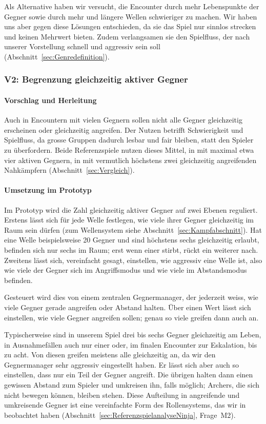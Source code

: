 \documentclass[../Main.tex]{subfiles}
\begin{document}
Als Alternative haben wir versucht, die Encounter durch mehr Lebenspunkte der Gegner sowie durch mehr und längere Wellen schwieriger zu machen. Wir haben uns aber gegen diese Lösungen entschieden, da sie das Spiel nur sinnlos strecken und keinen Mehrwert bieten. Zudem verlangsamen sie den Spielfluss, der nach unserer Vorstellung schnell und aggressiv sein soll (Abschnitt~\ref{sec:Genredefinition}).

\subsubsection{V2: Begrenzung gleichzeitig aktiver Gegner} \label{sec:V2}

\paragraph{Vorschlag und Herleitung}
Auch in Encountern mit vielen Gegnern sollen nicht alle Gegner gleichzeitig erscheinen oder gleichzeitig angreifen. Der Nutzen betrifft Schwierigkeit und Spielfluss, da grosse Gruppen dadurch lesbar und fair bleiben, statt den Spieler zu überfordern. Beide Referenzspiele nutzen dieses Mittel, in  mit maximal etwa vier aktiven Gegnern, in  mit vermutlich höchstens zwei gleichzeitig angreifenden Nahkämpfern (Abschnitt~\ref{sec:Vergleich}).

\paragraph{Umsetzung im Prototyp}
Im Prototyp wird die Zahl gleichzeitig aktiver Gegner auf zwei Ebenen reguliert. Erstens lässt sich für jede Welle festlegen, wie viele ihrer Gegner gleichzeitig im Raum sein dürfen (zum Wellensystem siehe Abschnitt~\ref{sec:Kampfabschnitt}). Hat eine Welle beispielsweise 20 Gegner und sind höchstens sechs gleichzeitig erlaubt, befinden sich nur sechs im Raum; erst wenn einer stirbt, rückt ein weiterer nach. Zweitens lässt sich, vereinfacht gesagt, einstellen, wie aggressiv eine Welle ist, also wie viele der Gegner sich im Angriffsmodus und wie viele im Abstandsmodus befinden.

Gesteuert wird dies von einem zentralen Gegnermanager, der jederzeit weiss, wie viele Gegner gerade angreifen oder Abstand halten. Über einen Wert lässt sich einstellen, wie viele Gegner angreifen sollen; genau so viele greifen dann auch an.

Typischerweise sind in unserem Spiel drei bis sechs Gegner gleichzeitig am Leben, in Ausnahmefällen auch nur einer oder, im finalen Encounter zur Eskalation, bis zu acht. Von diesen greifen meistens alle gleichzeitig an, da wir den Gegnermanager sehr aggressiv eingestellt haben. Er lässt sich aber auch so einstellen, dass nur ein Teil der Gegner angreift. Die übrigen halten dann einen gewissen Abstand zum Spieler und umkreisen ihn, falls möglich; Archers, die sich nicht bewegen können, bleiben stehen. Diese Aufteilung in angreifende und umkreisende Gegner ist eine vereinfachte Form des Rollensystems, das wir in  beobachtet haben (Abschnitt~\ref{sec:ReferenzspielanalyseNinja}, Frage~M2).
\end{document}
